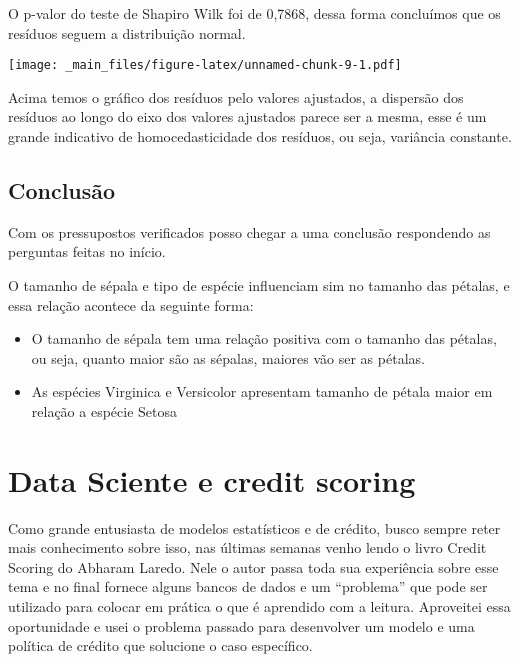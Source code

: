 \documentclass[
]{book}
\newenvironment{Shaded}{\begin{snugshade}}{\end{snugshade}}
\newcommand{\CommentTok}[1]{\textcolor[rgb]{0.56,0.35,0.01}{\textit{#1}}}
\newcommand{\FunctionTok}[1]{\textcolor[rgb]{0.00,0.00,0.00}{#1}}
\newcommand{\NormalTok}[1]{#1}
\newcommand{\SpecialCharTok}[1]{\textcolor[rgb]{0.00,0.00,0.00}{#1}}
\providecommand{\tightlist}{%
  \setlength{\itemsep}{0pt}\setlength{\parskip}{0pt}}
\begin{document}
O p-valor do teste de Shapiro Wilk foi de 0,7868, dessa forma concluímos que os resíduos seguem a distribuição normal.

\begin{Shaded}
\end{Shaded}

\texttt{[image: \_main\_files/figure-latex/unnamed-chunk-9-1.pdf]}

Acima temos o gráfico dos resíduos pelo valores ajustados, a dispersão dos resíduos ao longo do eixo dos valores ajustados parece ser a mesma, esse é um grande indicativo de homocedasticidade dos resíduos, ou seja, variância constante.

\hypertarget{conclusuxe3o}{%
\subsection{Conclusão}\label{conclusuxe3o}}

Com os pressupostos verificados posso chegar a uma conclusão respondendo as perguntas feitas no início.

O tamanho de sépala e tipo de espécie influenciam sim no tamanho das pétalas, e essa relação acontece da seguinte forma:

\begin{itemize}
\tightlist
\item
  O tamanho de sépala tem uma relação positiva com o tamanho das pétalas, ou seja, quanto maior são as sépalas, maiores vão ser as pétalas.
\item
  As espécies Virginica e Versicolor apresentam tamanho de pétala maior em relação a espécie Setosa
\end{itemize}

\hypertarget{data-sciente-e-credit-scoring}{%
\section{Data Sciente e credit scoring}\label{data-sciente-e-credit-scoring}}

Como grande entusiasta de modelos estatísticos e de crédito, busco sempre reter mais conhecimento sobre isso, nas últimas semanas venho lendo o livro Credit Scoring do Abharam Laredo. Nele o autor passa toda sua experiência sobre esse tema e no final fornece alguns bancos de dados e um ``problema'' que pode ser utilizado para colocar em prática o que é aprendido com a leitura. Aproveitei essa oportunidade e usei o problema passado para desenvolver um modelo e uma política de crédito que solucione o caso específico.
\end{document}
